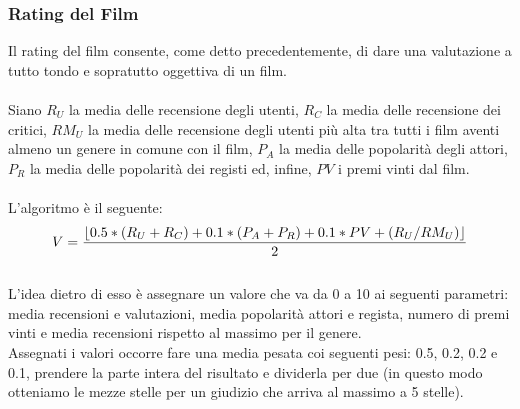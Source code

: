 \documentclass{article}
\DeclarePairedDelimiter\floor{\lfloor}{\rfloor}
\begin{document}
\subsubsection{Rating del Film}
Il rating del film consente, come detto precedentemente, di dare una valutazione a tutto tondo e sopratutto oggettiva di un film. \\ \\ 
Siano $R_{U}$ la media delle recensione degli utenti, $R_{C}$ la media delle recensione dei critici, $RM_{U}$ la media delle recensione degli utenti più alta tra tutti i film aventi almeno un genere in comune con il film, $P_{A}$ la media delle popolarità degli attori, $P_{R}$ la media delle popolarità dei registi ed, infine, $PV$ i premi vinti dal film. \\ \\
L'algoritmo è il seguente: \\ 
\[ V = \frac{\floor*{0.5 * (R_{U} + R_{C}) + 0.1 * (P_{A} + P_{R}) + 0.1 * PV + (R_{U} / RM_{U})}}{2}\] \\
L'idea dietro di esso è assegnare un valore che va da 0 a 10 ai seguenti parametri: media recensioni e valutazioni, media popolarità attori e regista, numero di premi vinti e media recensioni rispetto al massimo per il genere. \\
Assegnati i valori occorre fare una media pesata coi seguenti pesi: 0.5, 0.2, 0.2 e 0.1, prendere la parte intera del risultato e dividerla per due (in questo modo otteniamo le mezze stelle per un giudizio che arriva al massimo a 5 stelle).
\end{document}
